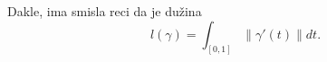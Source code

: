 \documentclass[preview]{standalone}
\begin{document}
\begin{center}
Dakle, ima smisla reci da je dužina \[l(\gamma) = \int_{[0,1]} \lVert \gamma'(t)\rVert dt.\]
\end{center}
\end{document}
